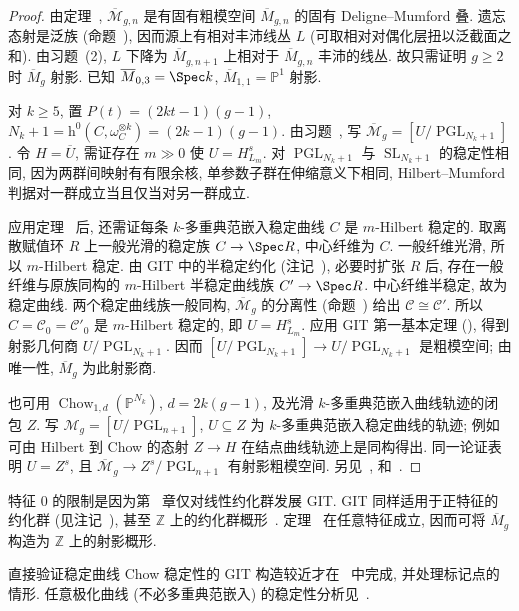 \begin{proof}
由定理~, $\overline{\mathcal M}_{g,\allowbreak n}$ 是有固有粗模空间 $\overline M_{g,\allowbreak n}$ 的固有 Deligne--Mumford 叠. 遗忘态射是泛族 (命题~), 因而源上有相对丰沛线丛 $L$ (可取相对对偶化层扭以泛截面之和). 由习题~(2), $L$ 下降为 $\overline M_{g,\allowbreak n+1}$ 上相对于 $\overline M_{g,\allowbreak n}$ 丰沛的线丛. 故只需证明 $g\geq2$ 时 $\overline M_g$ 射影. 已知 $\overline M_{0,\allowbreak 3}=\Spec k$, $\overline M_{1,\allowbreak 1}=\mathbb P^1$ 射影.

对 $k\geq5$, 置 $P(t)=(2kt-1)(g-1)$, $N_k+1=\mathrm h^0(C,\allowbreak \omega_C^{\otimes k})=(2k-1)(g-1)$. 由习题~, 写 $\overline{\mathcal M}_g=[U/\operatorname{PGL}_{N_k+1}]$. 令 $H=\overline U$, 需证存在 $m\gg0$ 使 $U=H_{L_m}^s$. 对 $\operatorname{PGL}_{N_k+1}$ 与 $\operatorname{SL}_{N_k+1}$ 的稳定性相同, 因为两群间映射有有限余核, 单参数子群在伸缩意义下相同, Hilbert--Mumford 判据对一群成立当且仅当对另一群成立.

应用定理~ 后, 还需证每条 $k$-多重典范嵌入稳定曲线 $C$ 是 $m$-Hilbert 稳定的. 取离散赋值环 $R$ 上一般光滑的稳定族 $\mathcal C\to\Spec R$, 中心纤维为 $C$. 一般纤维光滑, 所以 $m$-Hilbert 稳定. 由 GIT 中的半稳定约化 (注记~), 必要时扩张 $R$ 后, 存在一般纤维与原族同构的 $m$-Hilbert 半稳定曲线族 $\mathcal C'\to\Spec R$. 中心纤维半稳定, 故为稳定曲线. 两个稳定曲线族一般同构, $\overline{\mathcal M}_g$ 的分离性 (命题~) 给出 $\mathcal C\cong\mathcal C'$. 所以 $C=\mathcal C_0=\mathcal C'_0$ 是 $m$-Hilbert 稳定的, 即 $U=H_{L_m}^s$. 应用 GIT 第一基本定理 (), 得到射影几何商 $U/\operatorname{PGL}_{N_k+1}$. 因而 $[U/\operatorname{PGL}_{N_k+1}]\to\allowbreak U/\operatorname{PGL}_{N_k+1}$ 是粗模空间; 由唯一性, $\overline M_g$ 为此射影商.

也可用 $\operatorname{Chow}_{1,\allowbreak d}(\mathbb P^{N_k})$, $d=2k(g-1)$, 及光滑 $k$-多重典范嵌入曲线轨迹的闭包 $Z$. 写 $\mathcal M_g=[U/\operatorname{PGL}_{n+1}]$, $U\subseteq Z$ 为 $k$-多重典范嵌入稳定曲线的轨迹; 例如可由 Hilbert 到 Chow 的态射 $Z\to\allowbreak H$ 在结点曲线轨迹上是同构得出. 同一论证表明 $U=Z^s$, 且 $\overline{\mathcal M}_g\to\allowbreak Z^s/\operatorname{PGL}_{n+1}$ 有射影粗模空间. 另见~\cite[推论 5.2]{Mum77}, \cite[定理 2.0.2]{Gie82} 和~\cite[推论 4.42]{HM98}.
\end{proof}
\begin{remark}\label{src:6.8.7}
特征 $0$ 的限制是因为第~ 章仅对线性约化群发展 GIT. GIT 同样适用于正特征的约化群 (见注记~), 甚至 $\mathbb Z$ 上的约化群概形~\cite{Ses77}. 定理~ 在任意特征成立, 因而可将 $\overline M_g$ 构造为 $\mathbb Z$ 上的射影概形.

直接验证稳定曲线 Chow 稳定性的 GIT 构造较近才在~\cite{BS08,LW15} 中完成, 并处理标记点的情形. 任意极化曲线 (不必多重典范嵌入) 的稳定性分析见~\cite{Cap94,BFMV14}.
\end{remark}
